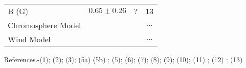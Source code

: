 \begin{table}[!hb]
\begin{center}
\begin{tabular}{lccc}
B (G) & $0.65 \pm 0.26$ & ? & 13\\
Chromosphere Model & \cite{drake_1985} & \cite{mcmurry_1999}& $\ldots$\\
Wind Model & \cite{drake_1985}& \cite{robinson_1998}& $\ldots$\\
\hline
\end{tabular}
\label{tab:3.4.1}
\begin{minipage}{14.0cm}
References.-(1)\cite{perryman_1997}; (2)\cite{gray_2006}; (3)\cite{van_leeuwen_2007}; (5a) \cite{ramirez_2011} (5b) \cite{richichi_2005}; (5)\cite{di_benedetto_1993}; (6)\cite{kallinger_2010}; (7)\cite{drake_1985}; (8)\cite{robinson_1998}; (9)\cite{massarotti_2008}; (10)\cite{decin_2003}; (11) \cite{gray_2006}; 
(12) \cite{hatzes_1993}; (13) \citep{sennhauser_2011}
\end{minipage}
\end{center}
\end{table}

